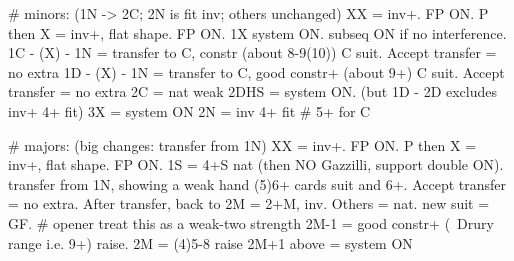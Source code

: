 # minors: (1N -> 2C; 2N is fit inv; others unchanged)
XX = inv+. FP ON.
P then X = inv+, flat shape. FP ON.
1X system ON. subseq ON if no interference.
1C - (X) - 1N = transfer to C, constr (about 8-9(10)) C suit. Accept transfer = no extra
1D - (X) - 1N = transfer to C, good constr+ (about 9+) C suit. Accept transfer = no extra
2C = nat weak
2DHS = system ON. (but 1D - 2D excludes inv+ 4+ fit)
3X = system ON
2N = inv 4+ fit  # 5+ for C

# majors: (big changes: transfer from 1N)
XX = inv+. FP ON.
P then X = inv+, flat shape. FP ON.
1S = 4+S nat (then NO Gazzilli, support double ON). 
transfer from 1N, showing a weak hand (5)6+ cards suit and 6+. Accept transfer = no extra. After transfer, back to 2M = 2+M, inv. Others = nat. new suit = GF.  # opener treat this as a weak-two strength
2M-1 = good constr+ (~Drury range i.e. 9+) raise. 2M = (4)5-8 raise
2M+1 above = system ON